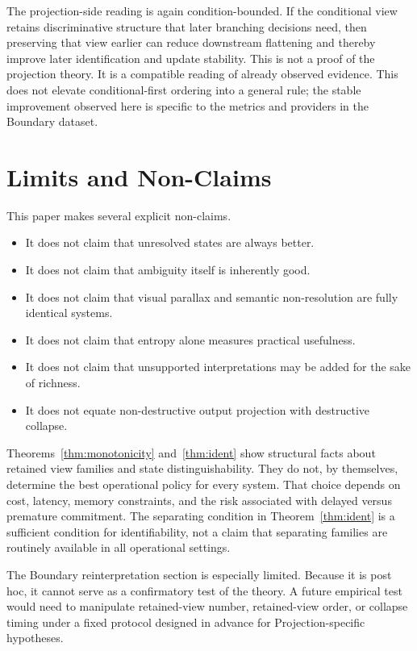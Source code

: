 \documentclass[11pt,a4paper]{article}
\begin{document}
The projection-side reading is again condition-bounded. If the conditional view retains discriminative structure that later branching decisions need, then preserving that view earlier can reduce downstream flattening and thereby improve later identification and update stability. This is not a proof of the projection theory. It is a compatible reading of already observed evidence.
This does not elevate conditional-first ordering into a general rule; the stable improvement observed here is specific to the metrics and providers in the Boundary dataset.

\section{Limits and Non-Claims}
\label{sec:limits}

This paper makes several explicit non-claims.

\begin{itemize}
  \item It does not claim that unresolved states are always better.
  \item It does not claim that ambiguity itself is inherently good.
  \item It does not claim that visual parallax and semantic non-resolution are fully identical systems.
  \item It does not claim that entropy alone measures practical usefulness.
  \item It does not claim that unsupported interpretations may be added for the sake of richness.
  \item It does not equate non-destructive output projection with destructive collapse.
\end{itemize}

Theorems~\ref{thm:monotonicity} and~\ref{thm:ident} show structural facts about retained view families and state distinguishability. They do not, by themselves, determine the best operational policy for every system. That choice depends on cost, latency, memory constraints, and the risk associated with delayed versus premature commitment.
The separating condition in Theorem~\ref{thm:ident} is a sufficient condition for identifiability, not a claim that separating families are routinely available in all operational settings.

The Boundary reinterpretation section is especially limited. Because it is post hoc, it cannot serve as a confirmatory test of the theory. A future empirical test would need to manipulate retained-view number, retained-view order, or collapse timing under a fixed protocol designed in advance for Projection-specific hypotheses.
\end{document}
